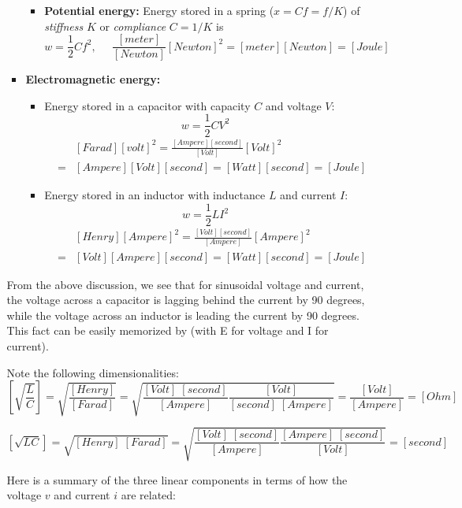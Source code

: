 \begin{itemize}
\begin{itemize}
\begin{itemize}
\begin{itemize}
    \item {\bf Potential energy:} Energy stored in a spring ($x=Cf=f/K$) 
      of {\em stiffness} $K$ or {\em compliance} $C=1/K$ is 
      \[
      w=\frac{1}{2}Cf^2,\;\;\;\;\;	
      \frac{[meter]}{[Newton]}[Newton]^2=[meter][Newton]=[Joule]
      \]	
    \end{itemize}
  \item {\bf Electromagnetic energy:}
    \begin{itemize}
    \item Energy stored in a capacitor with capacity $C$ and voltage $V$:
      \[	
      w=\frac{1}{2}CV^2
      \]
      \begin{eqnarray}
        &&[Farad][volt]^2=\frac{[Ampere][second]}{[Volt]}[Volt]^2
        \nonumber\\
        &=&[Ampere][Volt][second]=[Watt][second]=[Joule]
        \nonumber
      \end{eqnarray}
    \item Energy stored in an inductor with inductance $L$ and current $I$:
      \[	
      w=\frac{1}{2}LI^2
      \]
      \begin{eqnarray}
        &&[Henry][Ampere]^2=\frac{[Volt][second]}{[Ampere]}[Ampere]^2
        \nonumber\\
        &=&[Volt][Ampere][second]=[Watt][second]=[Joule]
        \nonumber
      \end{eqnarray}
    \end{itemize}
  \end{itemize}

  From the above discussion, we see that for sinusoidal voltage and
  current, the voltage across a capacitor is lagging behind the current
  by 90 degrees, while the voltage across an inductor is leading the
  current by 90 degrees. This fact can be easily memorized by 
  (with E for voltage and I for current).

  Note the following dimensionalities:
  \[ 
  \left[\sqrt{\frac{L}{C}}\right]=\sqrt{\frac{[Henry]}{[Farad]}}
  =\sqrt{\frac{[Volt]\;[second]}{[Ampere]}\frac{[Volt]}{[second]\;[Ampere]}}
  =\frac{[Volt]}{[Ampere]}=[Ohm] 
  \]
  \begin{comment}
  \[ 
  \left[\sqrt{\frac{L}{C}}\right]=\sqrt{\frac{H}{F}}
  =\sqrt{\frac{V\;s}{A}\;\;\frac{V}{s\;A}}=\frac{V}{A}=\Omega
  \]
  \end{comment}
  \[ 
  \left[ \sqrt{LC} \right]=\sqrt{[Henry]\;[Farad]}
  =\sqrt{\frac{[Volt]\;[second]}{[Ampere]}\frac{[Ampere]\;[second]}{[Volt]}}
  =[second]
  \]
  \begin{comment}
  \[ 
  \left[\sqrt{LC}\right]=\sqrt{H\; F}=\sqrt{ \frac{V\;s}{A} \frac{A\;s}{V} }
  =s
  \]
  \end{comment}
  Here is a summary of the three linear components in terms of how 
  the voltage $v$ and current $i$ are related:


\end{itemize}
\end{itemize}
